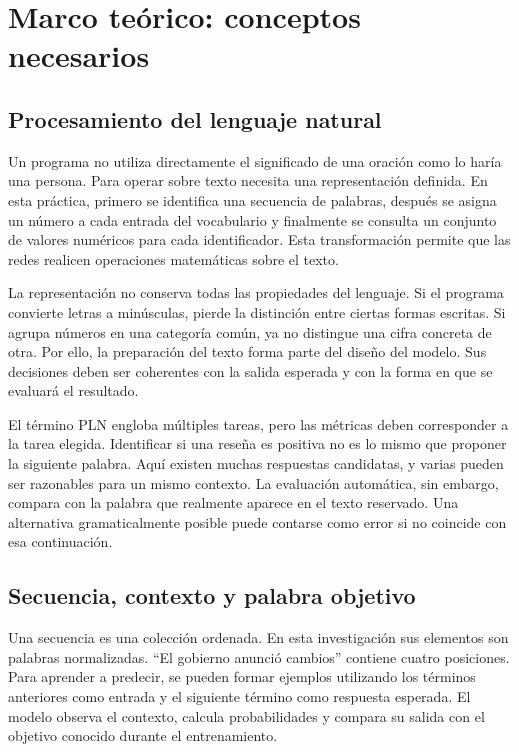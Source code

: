 \section{Marco teórico: conceptos necesarios}
\subsection{Procesamiento del lenguaje natural}
Un programa no utiliza directamente el significado de una oración como lo haría una persona. Para operar sobre texto necesita una representación definida. En esta práctica, primero se identifica una secuencia de palabras, después se asigna un número a cada entrada del vocabulario y finalmente se consulta un conjunto de valores numéricos para cada identificador. Esta transformación permite que las redes realicen operaciones matemáticas sobre el texto.

La representación no conserva todas las propiedades del lenguaje. Si el programa convierte letras a minúsculas, pierde la distinción entre ciertas formas escritas. Si agrupa números en una categoría común, ya no distingue una cifra concreta de otra. Por ello, la preparación del texto forma parte del diseño del modelo. Sus decisiones deben ser coherentes con la salida esperada y con la forma en que se evaluará el resultado.

El término PLN engloba múltiples tareas, pero las métricas deben corresponder a la tarea elegida. Identificar si una reseña es positiva no es lo mismo que proponer la siguiente palabra. Aquí existen muchas respuestas candidatas, y varias pueden ser razonables para un mismo contexto. La evaluación automática, sin embargo, compara con la palabra que realmente aparece en el texto reservado. Una alternativa gramaticalmente posible puede contarse como error si no coincide con esa continuación.

\subsection{Secuencia, contexto y palabra objetivo}
Una secuencia es una colección ordenada. En esta investigación sus elementos son palabras normalizadas. ``El gobierno anunció cambios'' contiene cuatro posiciones. Para aprender a predecir, se pueden formar ejemplos utilizando los términos anteriores como entrada y el siguiente término como respuesta esperada. El modelo observa el contexto, calcula probabilidades y compara su salida con el objetivo conocido durante el entrenamiento.

